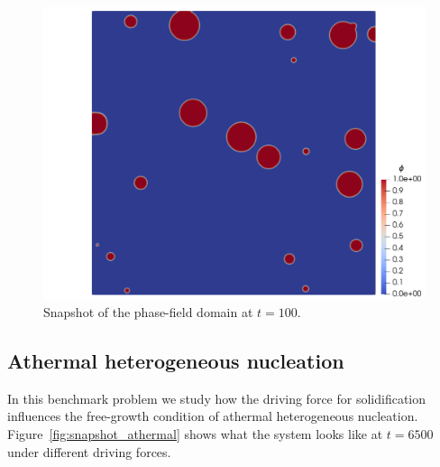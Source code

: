\documentclass[preprint,12pt]{elsarticle}
\begin{document}
%
\begin{center}
\begin{figure} 
\begin{centering}
\includegraphics[scale=0.80]{t100_multiple_seed_randt.PNG}
\par\end{centering}
\caption{Snapshot of the phase-field domain at $t=100$.} \label{fig:t100_multiple_seed_randt}
\end{figure}
\par\end{center}

\subsection{Athermal heterogeneous nucleation}

In this benchmark problem we study how the driving force for solidification influences the free-growth condition of athermal heterogeneous nucleation. Figure~\ref{fig:snapshot_athermal} shows what the system looks like at $t=6500$ under different driving forces. %
\end{document}
